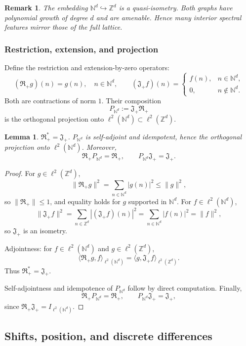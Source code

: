 \documentclass[10pt]{amsart}
\newcommand{\Z}{{\mathbb{Z}}}
\newcommand{\N}{{\mathbb{N}}}
\newcommand{\1}{{\mathbb{I}}}
\numberwithin{equation}{section}
\newtheorem{lemma}[theorem]{Lemma}%
\newtheorem{remark}[theorem]{Remark}%
\begin{document}
\begin{remark}
The embedding $\N^d\hookrightarrow\Z^d$ is a quasi-isometry. Both graphs have polynomial growth of degree $d$ and are amenable. Hence many interior spectral features mirror those of the full lattice.
\end{remark}

\subsubsection{Restriction, extension, and projection}
\label{subsec:restriction-extension}

Define the restriction and extension-by-zero operators:
\[
(\mathfrak R_+ g)(n) = g(n),\quad n\in \N^d,\qquad
(\mathfrak J_+ f)(n) =
\begin{cases}
f(n), & n\in \N^d,\\
0, & n\notin \N^d.
\end{cases}
\]
Both are contractions of norm $1$. Their composition
\[
P_{\N^d} := \mathfrak J_+\mathfrak R_+
\]
is the orthogonal projection onto $\ell^2(\N^d)\subset \ell^2(\Z^d)$.

\begin{lemma}
$\mathfrak R_+^* = \mathfrak J_+$.
$P_{\N^d}$ is self-adjoint and idempotent, hence the orthogonal projection onto $\ell^2(\N^d)$. Moreover,
\[
\mathfrak R_+ P_{\N^d} = \mathfrak R_+,\qquad
P_{\N^d}\mathfrak J_+ = \mathfrak J_+.
\]
\end{lemma}

\begin{proof}
For $g\in\ell^2(\Z^d)$,
\[
\|\mathfrak R_+ g\|^2 = \sum_{n\in\N^d} |g(n)|^2 \le \|g\|^2,
\]
so $\|\mathfrak R_+\|\le 1$, and equality holds for $g$ supported in $\N^d$. For $f\in\ell^2(\N^d)$,
\[
\|\mathfrak J_+ f\|^2 = \sum_{n\in\Z^d} |(\mathfrak J_+ f)(n)|^2 = \sum_{n\in\N^d} |f(n)|^2 = \|f\|^2,
\]
so $\mathfrak J_+$ is an isometry.

Adjointness: for $f\in\ell^2(\N^d)$ and $g\in\ell^2(\Z^d)$,
\[
\langle \mathfrak R_+ g, f\rangle_{\ell^2(\N^d)} = \langle g, \mathfrak J_+ f\rangle_{\ell^2(\Z^d)}.
\]
Thus $\mathfrak R_+^* = \mathfrak J_+$.

Self-adjointness and idempotence of $P_{\N^d}$ follow by direct computation. Finally,
\[
\mathfrak R_+ P_{\N^d} = \mathfrak R_+,\qquad
P_{\N^d}\mathfrak J_+ = \mathfrak J_+,
\]
since $\mathfrak R_+\mathfrak J_+=I_{\ell^2(\N^d)}$.
\end{proof}
\subsection{Shifts, position, and discrete differences}
\label{subsec:shifts-position}
\end{document}
